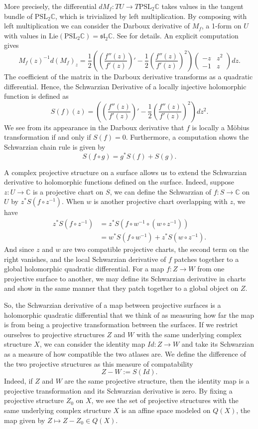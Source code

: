 \documentclass{amsart}
\newcommand{\C}{\mathbb{C}}
\begin{document}
More precisely, the differential $d M_f: TU \to T \mathrm{PSL}_2\C$ takes values in the tangent bundle of $\mathrm{PSL}_2\C$, which is trivialized by left multiplication. 
By composing with left multiplication we can consider the Darboux derivative of $M_f$, a 1-form on $U$ with values in $\mathrm{Lie}(\mathrm{PSL}_2\C) = \mathfrak{sl}_2 \C$. See \cite{sharpeyear} for details.
An explicit computation gives
\[
M_f(z)^{-1} d(M_f)_z = \frac{1}{2} \left( \left( \frac{f''(z)}{f'(z)} \right)' - \frac{1}{2} \left( \frac{f''(z)}{f'(z)} \right)^2 \right)
\begin{pmatrix}
-z & z^2 \\
-1 & z 
\end{pmatrix}
dz.
\]
The coefficient of the matrix in the Darboux derivative transforms as a quadratic differential. 
Hence, the Schwarzian Derivative of a locally injective holomorphic function is defined as 
\[
S(f)(z) = \left( \left( \frac{f''(z)}{f'(z)} \right)' - \frac{1}{2} \left( \frac{f''(z)}{f'(z)} \right)^2 \right) dz^2.
\]
We see from its appearance in the Darboux derivative that $f$ is locally a M\"obius transformation if and only if $S(f) = 0$.
Furthermore, a computation shows the Schwarzian chain rule is given by
\[
S(f \circ g) = g^* S(f) + S(g).
\]


A complex projective structure on a surface allows us to extend the Schwarzian derivative to holomorphic functions defined on the surface.
Indeed, suppose $z: U \to \C$ is a projective chart on $S$, we can define the Schwarzian of $f:S \to \C$ on $U$ by $z^*S(f \circ z^{-1})$.
When $w$ is another projective chart overlapping with $z$, we have
\begin{align*}
z^*S(f \circ z^{-1})
&= z^* S(f \circ w^{-1} \circ (w \circ z^{-1})) \\
&= w^*S(f \circ w^{-1}) + z^*S(w \circ z^{-1}).
\end{align*}
And since $z$ and $w$ are two compatible projective charts, the second term on the right vanishes, and the local Schwarzian derivative of $f$ patches together to a global holomorphic quadratic differential.
For a map $f: Z \to W$ from one projective surface to another, we may define its Schwarzian derivative in charts and show in the same manner that they patch together to a global object on $Z$.

So, the Schwarzian derivative of a map between projective surfaces is a holomorphic quadratic differential that we think of as measuring how far the map is from being a projective transformation between the surfaces. 
If we restrict ourselves to projective structures $Z$ and $W$ with the same underlying complex structure $X$, we can consider the identity map $Id: Z \to W$ and take its Schwarzian as a measure of how compatible the two atlases are. 
We define the difference of the two projective structures as this measure of compatability
\[
Z - W := S(Id).
\]
Indeed, if $Z$ and $W$ are the same projective structure, then the identity map is a projective transformation and its Schwarzian derivative is zero.
By fixing a projective structure $Z_0$ on $X$, we see the set of projective structures with the same underlying complex structure $X$ is an affine space modeled on $Q(X)$, the map given by $Z \mapsto Z-Z_0 \in Q(X)$.
\end{document}
